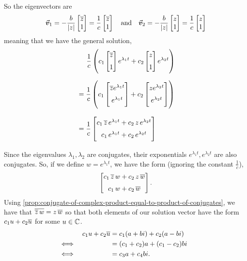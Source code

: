 \documentclass[../MathsNotesBase.tex]{subfiles}
\begin{document}
{		So the eigenvectors are
		\[
			\vec{\bm{v}}_1 = -\frac{b}{\left\lvert z\right\rvert} \begin{bmatrix}\overline{z}\\ 1\end{bmatrix} = \frac{1}{c} \begin{bmatrix}\overline{z}\\ 1\end{bmatrix} \hspace{10pt}\text{and}\hspace{10pt} \vec{\bm{v}}_2 = -\frac{b}{\left\lvert z\right\rvert} \begin{bmatrix}z\\ 1\end{bmatrix} = \frac{1}{c} \begin{bmatrix}z\\ 1\end{bmatrix}
		\]
		meaning that we have the general solution,
		\[\begin{aligned}
			&\hspace{14pt} \frac{1}{c} \left( c_1 \begin{bmatrix}\conj{z}\nn 1\end{bmatrix} e^{\lambda_1 t} + c_2 \begin{bmatrix}z\nn 1\end{bmatrix} e^{\lambda_2 t} \right) \nn
			&= \frac{1}{c} \left( c_1 \begin{bmatrix}\conj{z}  e^{\lambda_1 t}\nn  e^{\lambda_1 t}\end{bmatrix} + c_2 \begin{bmatrix}z  e^{\lambda_2 t}\nn  e^{\lambda_2 t}\end{bmatrix} \right) \nnn
			&= \frac{1}{c} \begin{bmatrix}c_1 \, \conj{z} \, e^{\lambda_1 t} + c_2 \, z \, e^{\lambda_2 t} \nn c_1 \, e^{\lambda_1 t} + c_2 \, e^{\lambda_2 t} \end{bmatrix} \nn
		\end{aligned}\]
		Since the eigenvalues ${ \lambda_1, \lambda_2 }$ are conjugates, their exponentials ${ e^{\lambda_1 t}, e^{\lambda_2 t} }$ are also conjugates. So, if we define ${ w = e^{\lambda_1 t} }$, we have the form (ignoring the constant ${ \frac{1}{c} }$),
		\[
			\begin{bmatrix}
				c_1 \, \conj{z} \, w + c_2 \, z \, \conj{w} \nn
				c_1 \, w + c_2 \, \conj{w}
			\end{bmatrix}.
		\]
		Using \autoref{prop:conjugate-of-complex-product-equal-to-product-of-conjugates}, we have that ${ \overline{\overline{z} \, w} = z \, \overline{w} }$ so that both elements of our solution vector have the form ${ c_1 u + c_2 \overline{u} }$ for some ${ u \in \mathbb{C}^{} }$. 
		\[\begin{aligned}
			&& c_1 u + c_2 \overline{u} &= c_1 (a + bi) + c_2 (a - bi) \\
			&\iff &  &= (c_1 + c_2)a + (c_1 - c_2)bi &\text{\scriptsize{}} \\
			&\iff &  &= c_3 a + c_4 bi. &\text{\scriptsize{}} \\
		\end{aligned}\]
	
}
\end{document}
